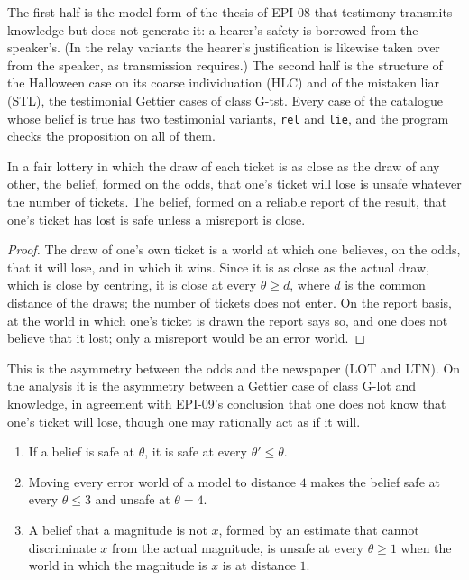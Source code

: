 \documentclass{situationist-preprint}
\begin{document}
The first half is the model form of the thesis of EPI-08 that testimony transmits knowledge but does not generate it: a hearer's safety is borrowed from the speaker's. (In the relay variants the hearer's justification is likewise taken over from the speaker, as transmission requires.) The second half is the structure of the Halloween case on its coarse individuation (HLC) and of the mistaken liar (STL), the testimonial Gettier cases of class G-tst. Every case of the catalogue whose belief is true has two testimonial variants, \texttt{rel} and \texttt{lie}, and the program checks the proposition on all of them.

\begin{proposition}[Lotteries]\label{p:lottery}
In a fair lottery in which the draw of each ticket is as close as the draw of any other, the belief, formed on the odds, that one's ticket will lose is unsafe whatever the number of tickets. The belief, formed on a reliable report of the result, that one's ticket has lost is safe unless a misreport is close.
\end{proposition}

\begin{proof}
The draw of one's own ticket is a world at which one believes, on the odds, that it will lose, and in which it wins. Since it is as close as the actual draw, which is close by centring, it is close at every $\theta \geq d$, where $d$ is the common distance of the draws; the number of tickets does not enter. On the report basis, at the world in which one's ticket is drawn the report says so, and one does not believe that it lost; only a misreport would be an error world.
\end{proof}

This is the asymmetry between the odds and the newspaper (LOT and LTN). On the analysis it is the asymmetry between a Gettier case of class G-lot and knowledge, in agreement with EPI-09's conclusion that one does not know that one's ticket will lose, though one may rationally act as if it will.

\begin{proposition}\label{p:margin}
\begin{enumerate}[label=(\alph*)]
\item If a belief is safe at $\theta$, it is safe at every $\theta' \leq \theta$.
\item Moving every error world of a model to distance $4$ makes the belief safe at every $\theta \leq 3$ and unsafe at $\theta = 4$.
\item A belief that a magnitude is not $x$, formed by an estimate that cannot discriminate $x$ from the actual magnitude, is unsafe at every $\theta \geq 1$ when the world in which the magnitude is $x$ is at distance $1$.
\end{enumerate}
\end{proposition}
\end{document}

